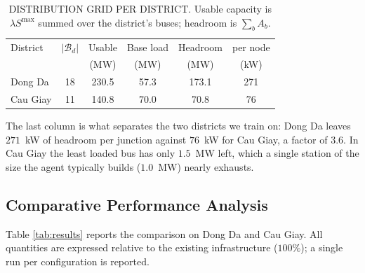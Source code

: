 \documentclass[10pt, conference, a4paper, compsocconf]{IEEEtran}
\begin{document}
\begin{table}[t]
\renewcommand{\arraystretch}{1.15}
\setlength{\tabcolsep}{4pt}
\caption{\uppercase{Distribution grid per district}. Usable capacity is
$\lambda S^{\max}$ summed over the district's buses; headroom is $\sum_b A_b$.}
\label{tab:grid}
\centering
\footnotesize
\begin{tabular}{lccccc}
\toprule
District & $|\mathcal{B}_d|$ & Usable & Base load & Headroom & per node \\
 & & (MW) & (MW) & (MW) & (kW) \\
\midrule
Dong Da     & 18 & 230.5 & 57.3 & 173.1 & 271 \\
Cau Giay    & 11 & 140.8 & 70.0 & \phantom{0}70.8 & \phantom{0}76 \\
\bottomrule
\end{tabular}
\end{table}

The last column is what separates the two districts we train on: Dong Da leaves
$271$~kW of headroom per junction against $76$~kW for Cau Giay, a factor of
$3.6$. In Cau Giay the least loaded bus has only $1.5$~MW left, which a single
station of the size the agent typically builds ($1.0$~MW) nearly exhausts.

\subsection{Comparative Performance Analysis}

Table \ref{tab:results} reports the comparison on Dong Da and Cau Giay. All quantities are expressed relative to the existing infrastructure ($100\%$); a single run per configuration is reported.
\end{document}
